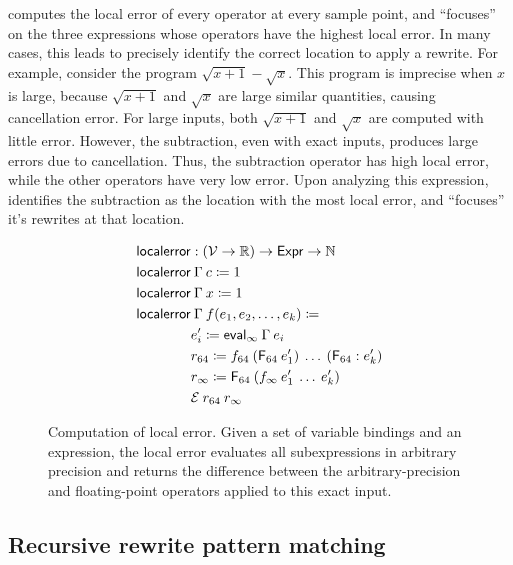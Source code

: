 \documentclass[paper.tex]{subfiles}
\begin{document}
\casio computes the local error of every operator at every sample point,
  and ``focuses'' on the three expressions
  whose operators have the highest local error.
In many cases, this leads \casio to precisely identify the correct location
  to apply a rewrite.
For example, consider the program $\sqrt{x+1} - \sqrt{x}$.
This program is imprecise when $x$ is large,
  because $\sqrt{x+1}$ and $\sqrt{x}$ are large similar quantities,
  causing cancellation error.
For large inputs, both $\sqrt{x+1}$ and $\sqrt{x}$
  are computed with little error.
However, the subtraction, even with exact inputs,
  produces large errors due to cancellation.
Thus, the subtraction operator has high local error,
  while the other operators have very low error.
Upon analyzing this expression, 
  \casio identifies the subtraction as the location with the most local error,
  and ``focuses'' it's rewrites at that location.

\begin{figure}
\begin{align*}
  \|localerror| &: (\Var \to \RR) \to \Expr \to \NN \\
  \|localerror| &\:\Gamma\:c \ceq 1 \\
  \|localerror| &\:\Gamma\:x \ceq 1 \\
  \|localerror| &\:\Gamma\:f(e_1, e_2, \ldots, e_k) \ceq \\
  & e_i' \ceq \|eval|_\infty\:\Gamma\:e_i \\
  & r_{64} \ceq f_{64}\:(\F_{64}\:e_1')\:\ldots\:(\F_{64}:e_k') \\
  & r_\infty \ceq \F_{64}\:(f_\infty\:e_1'\:\ldots\:e_k') \\
  & \Err\:r_{64}\:r_\infty \\
\end{align*}
\caption{Computation of local error.
  Given a set of variable bindings and an expression,
  the local error evaluates all subexpressions in arbitrary precision and returns
  the difference between the arbitrary-precision and floating-point operators
  applied to this exact input.}
\label{alg:focus}
\end{figure}

\subsection{Recursive rewrite pattern matching}
\end{document}
